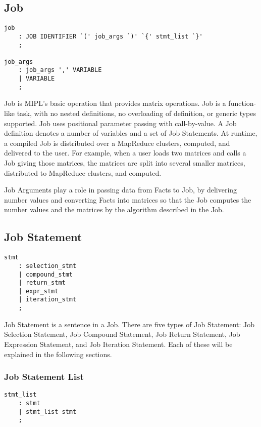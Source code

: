 \documentclass[prodmode,acmtecs]{acmsmall}
\begin{document}
\subsection{Job}

\begin{lstlisting}
job
	: JOB IDENTIFIER `(' job_args `)' `{' stmt_list `}'
	;

job_args
	: job_args ',' VARIABLE
	| VARIABLE
	;
\end{lstlisting}

\label{Job_Section}
Job is MIPL's basic operation that provides matrix operations.
Job is a function-like task, with no nested definitions, no
overloading of definition, or generic types supported. Job uses
positional parameter passing with call-by-value.  A Job
definition denotes a number of variables and a set of Job
Statements.  At runtime, a compiled Job is distributed over
a MapReduce clusters, computed, and delivered to the user. For
example, when a user loads two matrices and calls a Job giving those
matrices, the matrices are split into several smaller matrices,
distributed to MapReduce clusters, and computed.

Job Arguments play a role in passing data from Facts to Job, by
delivering number values and converting Facts into matrices
so that the Job computes the number values and the matrices by
the algorithm described in the Job.
\medskip

\subsection{Job Statement}

\begin{lstlisting}
stmt
	: selection_stmt
	| compound_stmt
	| return_stmt
	| expr_stmt
	| iteration_stmt
	;
\end{lstlisting}

Job Statement is a sentence in a Job.  There are five types of
Job Statement: Job Selection Statement, Job Compound Statement,
Job Return Statement, Job Expression Statement, and Job Iteration
Statement.  Each of these will be explained in the following
sections.
\medskip

\subsubsection{Job Statement List}

\begin{lstlisting}
stmt_list
	: stmt
	| stmt_list stmt
	;
\end{lstlisting}
\end{document}
